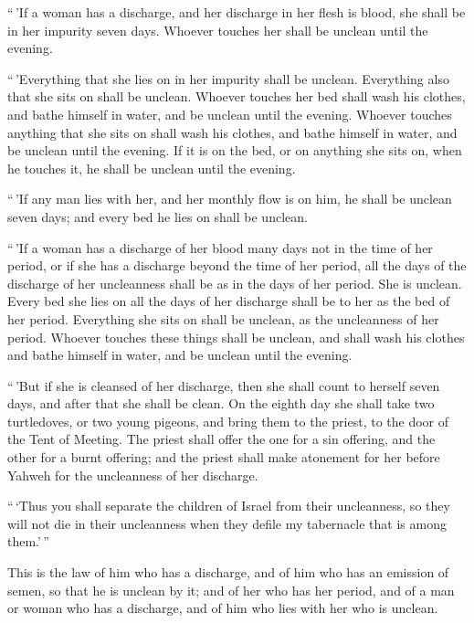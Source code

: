  ``\,'If a woman has a discharge, and her discharge in
her flesh is blood, she shall be in her impurity seven days. Whoever
touches her shall be unclean until the evening.

 ``\,'Everything that she lies on in her impurity shall
be unclean. Everything also that she sits on shall be unclean.
 Whoever touches her bed shall wash his clothes, and
bathe himself in water, and be unclean until the evening.
 Whoever touches anything that she sits on shall wash his
clothes, and bathe himself in water, and be unclean until the evening.
 If it is on the bed, or on anything she sits on, when he
touches it, he shall be unclean until the evening.

 ``\,'If any man lies with her, and her monthly flow is
on him, he shall be unclean seven days; and every bed he lies on shall
be unclean.

 ``\,'If a woman has a discharge of her blood many days
not in the time of her period, or if she has a discharge beyond the time
of her period, all the days of the discharge of her uncleanness shall be
as in the days of her period. She is unclean.  Every bed
she lies on all the days of her discharge shall be to her as the bed of
her period. Everything she sits on shall be unclean, as the uncleanness
of her period.  Whoever touches these things shall be
unclean, and shall wash his clothes and bathe himself in water, and be
unclean until the evening.

 ``\,'But if she is cleansed of her discharge, then she
shall count to herself seven days, and after that she shall be clean.
 On the eighth day she shall take two turtledoves, or two
young pigeons, and bring them to the priest, to the door of the Tent of
Meeting.  The priest shall offer the one for a sin
offering, and the other for a burnt offering; and the priest shall make
atonement for her before Yahweh for the uncleanness of her discharge.

 ``\,`Thus you shall separate the children of Israel from
their uncleanness, so they will not die in their uncleanness when they
defile my tabernacle that is among them.'\,''

 This is the law of him who has a discharge, and of him
who has an emission of semen, so that he is unclean by it;
 and of her who has her period, and of a man or woman who
has a discharge, and of him who lies with her who is unclean.

